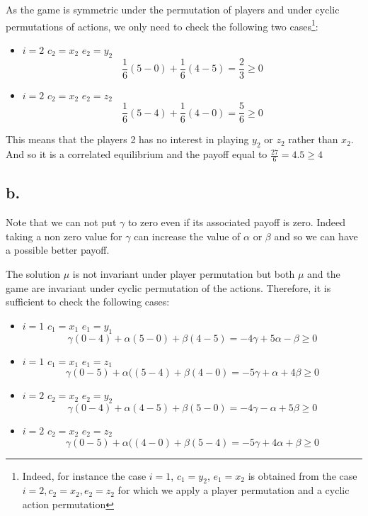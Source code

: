 As the game is symmetric under the permutation of players and under cyclic permutations of actions, we only need to check the following two cases\footnote{Indeed, for instance the case $i=1$, $c_1 = y_2$, $e_1 = x_2$ is obtained from the case $i=2, c_2 = x_2, e_2 = z_2$ for which we apply a player permutation and a cyclic action permutation}:
\begin{itemize}
  \item $i=2$ $c_2=x_2$  $e_2=y_2$
    \begin{equation*}
      \frac{1}{6}(5-0) + \frac{1}{6}(4-5) = \frac{2}{3} \ge 0
    \end{equation*}
  \item $i=2$ $c_2=x_2$  $e_2=z_2$
    \begin{equation*}
      \frac{1}{6}(5-4) + \frac{1}{6}(4-0) = \frac{5}{6} \ge 0
    \end{equation*}
\end{itemize}

This means that the players 2 has no interest in playing $y_2$ or $z_2$ rather than $x_2$. And so it is a correlated equilibrium and the payoff equal to $\frac{27}{6} = 4.5 \ge 4$

\subsection*{b.}

Note that we can not put $\gamma$ to zero even if its associated payoff is zero.
Indeed taking a non zero value for $\gamma$ can increase the value of $\alpha$ or $\beta$ and so we can have a possible better payoff.

The solution $\mu$ is not invariant under player permutation but both $\mu$ and the game are invariant under cyclic permutation of the actions.
Therefore, it is sufficient to check the following cases:

\begin{itemize}
  \item $i=1$ $c_1=x_1$  $e_1=y_1$
    \begin{equation*}
      \gamma(0-4) + \alpha(5-0) + \beta(4-5) = -4\gamma + 5\alpha - \beta \ge 0
    \end{equation*}
  \item $i=1$ $c_1=x_1$  $e_1=z_1$
    \begin{equation*}
      \gamma(0-5) + \alpha((5-4) + \beta(4-0) = -5\gamma + \alpha + 4\beta \ge 0
    \end{equation*}

  \item $i=2$ $c_2=x_2$  $e_2=y_2$
    \begin{equation*}
      \gamma(0-4) + \alpha(4-5) + \beta(5-0) = -4\gamma - \alpha + 5\beta \ge 0
    \end{equation*}
  \item $i=2$ $c_2=x_2$  $e_2=z_2$
    \begin{equation*}
      \gamma(0-5) + \alpha((4-0) + \beta(5-4) = -5\gamma + 4\alpha + \beta \ge 0
    \end{equation*}
\end{itemize}

